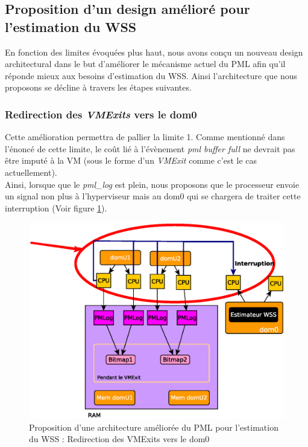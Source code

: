 \subsection{Proposition d'un design amélioré pour l'estimation du WSS} 
En fonction des limites évoquées plus haut, nous avons conçu un nouveau design architectural dans le but d'améliorer le mécanisme actuel du PML afin qu'il réponde mieux aux besoins d'estimation du WSS. Ainsi l'architecture que nous proposons se décline à travers les étapes suivantes.

\subsubsection{Redirection des \textit{VMExits} vers le dom0}
Cette amélioration permettra de pallier la limite 1. Comme mentionné dans l'énoncé de cette limite, le coût lié à l'évènement \textit{pml buffer full} ne devrait pas être imputé à la VM (sous le forme d'un \textit{VMExit} comme c'est le cas actuellement).\\
Ainsi, lorsque que le \textit{pml\_log} est plein, nous proposons que le processeur envoie un signal non plus à l'hyperviseur mais au dom0 qui se chargera de traiter cette interruption (Voir figure \ref{fig:redirection_vmexit}).

\begin{figure}[H]
    \centering
    \includegraphics[scale=.7]{chapters/3/fig3/PMLOverview1}
    \caption{Proposition d'une architecture améliorée du PML pour l'estimation du WSS : Redirection des VMExits vers le dom0}
    \label{fig:redirection_vmexit}
\end{figure}

